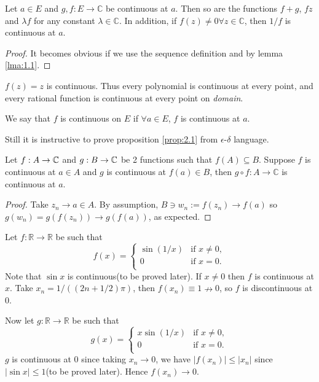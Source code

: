 \begin{proposition}\label{prop:2.1}
    Let $a\in E$ and $ g,f:E\to \mathbb{C} $ be continuous at $a$. Then so are the functions $ f+g $, $fz$ and $\lambda f$ for any constant $ \lambda\in \mathbb{C} $. In addition, if $f(z)\neq 0 \forall z\in \mathbb{C} $, then $ 1/f $ is continuous at $a$.
\end{proposition}
\begin{proof}
    It becomes obvious if we use the sequence definition and by lemma \ref{lma:1.1}.
\end{proof}

\begin{example}
    $ f(z)=z $ is continuous. Thus every polynomial is continuous at every point, and every rational function is continuous at every point on \textit{domain}.
\end{example}

\begin{note}
    We say that $f$ is continuous on $E$ if $ \forall a\in E $, $f$ is continuous at $a$.
\end{note}
\begin{remark}
    Still it is instructive to prove proposition \ref{prop:2.1} from $ \epsilon $-$ \delta $ language.
\end{remark}

\begin{theorem}\label{thm:2.2}
    Let $f:A\to {\mathbb{C}}$ and $g:B\to {\mathbb{C}}$ be 2 functions such that $ f(A) \subseteq B $. Suppose $f$ is continuous at $a\in A$ and $g$ is continuous at $f(a)\in B$, then $ g \circ f:A\to \mathbb{C}  $ is continuous at $a$.
\end{theorem}
\begin{proof}
    Take $ z_n\to a\in A $. By assumption, $ B\ni w_n:=f(z_n)\to f(a) $ so $ g(w_n)=g(f(z_n))\to g(f(a)) $, as expected.
\end{proof}

\begin{example}
    Let $ f:\mathbb{R} \to \mathbb{R}  $ be such that
    \[
        f(x) = \begin{cases}
            \sin \left( 1/x \right) & \text{if } x\neq 0, \\
            0                       & \text{if }x=0.      \\
        \end{cases}
    \]
    Note that $ \sin x $ is continuous(to be proved later). If $x\neq 0$ then $f$ is continuous at $x$. Take $ x_n = 1/((2n+1/2)\pi) $, then $ f(x_n)\equiv 1\nrightarrow 0 $, so $f$ is discontinuous at 0.

    Now let $g:\mathbb{R} \to \mathbb{R} $ be such that
    \[
        g(x)=\begin{cases}
            x\sin \left( 1/x \right) & \text{if } x\neq 0, \\
            0                        & \text{if }x=0.      \\
        \end{cases}
    \]
    $g$ is continuous at 0 since taking $ x_n\to 0 $, we have $ |f(x_n)|\le |x_n| $ since $ |\sin x|\le 1 $(to be proved later). Hence $ f(x_n)\to 0 $.
\end{example}

